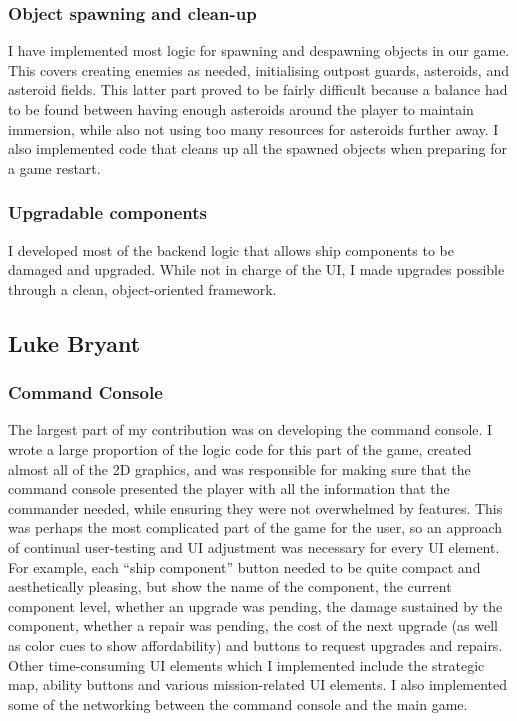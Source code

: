\documentclass[a4paper,11pt]{article}
\begin{document}
\subsubsection{Object spawning and clean-up}

I have implemented most logic for spawning and despawning objects in our game. This covers creating enemies as needed, initialising outpost guards, asteroids, and asteroid fields. This latter part proved to be fairly difficult because a balance had to be found between having enough asteroids around the player to maintain immersion, while also not using too many resources for asteroids further away. I also implemented code that cleans up all the spawned objects when preparing for a game restart.

\subsubsection{Upgradable components}

I developed most of the backend logic that allows ship components to be damaged and upgraded. While not in charge of the UI, I made upgrades possible through a clean, object-oriented framework.

\clearpage

\subsection{Luke Bryant}

\subsubsection{Command Console}

The largest part of my contribution was on developing the command console. I wrote a large proportion of the logic code for this part of the game, created almost all of the 2D graphics, and was responsible for making sure that the command console presented the player with all the information that the commander needed, while ensuring they were not overwhelmed by features. This was perhaps the most complicated part of the game for the user, so an approach of continual user-testing and UI adjustment was necessary for every UI element. For example, each “ship component” button needed to be quite compact and aesthetically pleasing, but show the name of the component, the current component level, whether an upgrade was pending, the damage sustained by the component, whether a repair was pending, the cost of the next upgrade (as well as color cues to show affordability) and buttons to request upgrades and repairs. Other time-consuming UI elements which I implemented include the strategic map, ability buttons and various mission-related UI elements. I also implemented some of the networking between the command console and the main game.
\end{document}
